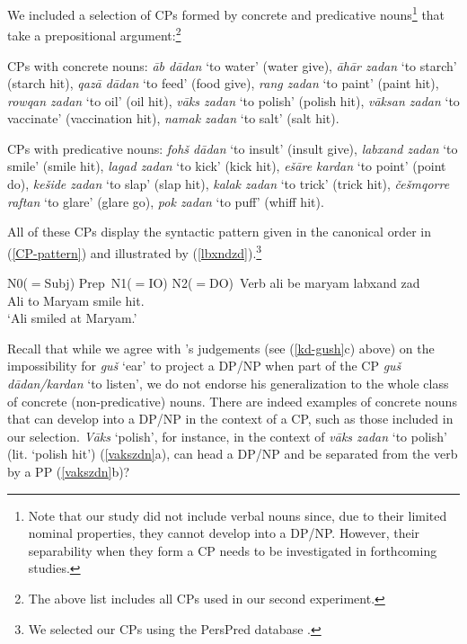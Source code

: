 \documentclass[output=paper]{langsci/langscibook}
\begin{document}
We included a selection of CPs formed by concrete and predicative nouns\footnote{Note that our study did not include verbal nouns since, due to their limited nominal properties, they cannot develop into a DP/NP. However, their separability when they form a CP needs to be investigated in forthcoming studies.} that take a prepositional argument:\footnote{The above list includes all CPs used in our second experiment.}

\begin{description}\label{ListCP}
	\item CPs with concrete nouns: \textit{\=ab d\=adan} `to water' (water give), \textit{\=ah\=ar zadan} `to starch' (starch hit), \textit{qaz\=a d\=adan} `to feed' (food give), \textit{rang zadan} `to paint' (paint hit), \textit{rowqan zadan} `to oil' (oil hit), \textit{v\=aks zadan} `to polish' (polish hit),  \textit{v\=aksan zadan} `to vaccinate' (vaccination hit), \textit{namak zadan} `to salt' (salt hit).
	\item CPs with predicative nouns: \textit{foh\v{s} d\=adan} `to insult' (insult give), \textit{labxand zadan} `to smile' (smile hit), \textit{lagad zadan} `to kick' (kick hit), \textit{e\v{s}\=are kardan} `to point' (point do), \textit{ke\v{s}ide zadan} `to slap' (slap hit), \textit{kalak zadan} `to trick' (trick hit), \textit{\v{c}e\v{s}mqorre raftan} `to glare' (glare go), \textit{pok zadan} `to puff' (whiff hit).
\end{description}

All of these CPs display the syntactic pattern given in the canonical order in (\ref{CP-pattern}) and illustrated by (\ref{lbxndzd}).\footnote{We selected our CPs using the PersPred database \citep{SamFag2013}.}

\begin{exe}
	\ex\label{CP-pattern}
	N0($=$Subj) Prep~N1($=$IO) N2($=$DO)~Verb
	\ex\label{lbxndzd}
	\gll ali be maryam labxand zad\\
	Ali to Maryam smile hit.\\
	\glt	`Ali smiled at Maryam.'	
\end{exe}

Recall that while we agree with \citeauthor{Karimi-Doostan1997}'s judgements (see (\ref{kd-gush}c) above) on the impossibility for \textit{gu\v{s}} `ear' to project a DP/NP when part of the CP \textit{gu\v{s} d\=adan/kardan} `to listen', we do not endorse his generalization to the whole class of concrete (non-predicative) nouns. There are indeed examples of concrete nouns that can develop into a DP/NP in the context of a CP, such as those included in our selection. \textit{V\=aks} `polish', for instance, in the context of \textit{v\=aks zadan} `to polish' (lit. `polish hit') (\ref{vakszdn}a), can head a DP/NP and be separated from the verb by a PP (\ref{vakszdn}b)?
\end{document}
